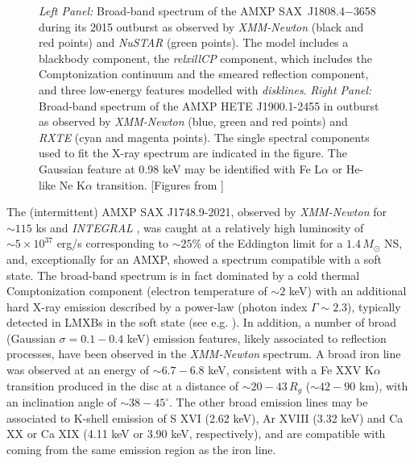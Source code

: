 \documentclass[graybox]{svmult}
\def \inte {{\em INTEGRAL\xspace}}
\def \xmm {{\em XMM-Newton\xspace}}
\def \rxte {{\em RXTE\xspace}}
\def \saxj{{\rm SAX~J1808.4$-$3658\xspace}}
\def \nustar{{\em NuSTAR\xspace}}
\begin{document}
\begin{figure}
\begin{subfigure}{.5\textwidth}
  \label{fig:sfig2}
\end{subfigure}
\caption{\textit{Left Panel:} Broad-band spectrum of the AMXP \saxj{} during its 2015 outburst as observed by \xmm{} (black and red points) and \nustar{} (green points). The model includes a blackbody component, the {\it relxillCP} component, which includes the Comptonization continuum and the smeared reflection component, and three low-energy features modelled with {\it disklines}. \textit{Right Panel:} Broad-band spectrum of the AMXP HETE J1900.1-2455 in outburst as observed by \xmm{} (blue, green and red points) and \rxte{} (cyan and magenta points). The single spectral components used to fit the X-ray spectrum are indicated in the figure. The Gaussian feature at 0.98 keV may be identified with Fe L$\alpha$ or He-like Ne K$\alpha$ transition. [Figures from \cite{DiSalvo2019,Papitto2013a}]}
\label{fig:spec}
\end{figure}





The (intermittent) AMXP SAX J1748.9-2021, observed by \xmm{} for $\sim 115$ ks and \inte{} \cite{Pintore2016}, was caught at a relatively high luminosity of $\sim 5 \times 10^{37}$ erg/s corresponding to $\sim 25\%$ of the Eddington limit for a $1.4\, M_\odot$ NS, and, exceptionally for an AMXP, showed a spectrum compatible with a soft state. The broad-band spectrum is in fact dominated by a cold thermal Comptonization component (electron temperature of $\sim 2$ keV) with an additional hard X-ray emission described by a power-law (photon index $\Gamma \sim 2.3$), typically detected in LMXBs in the soft state (see e.g. \cite{DiSalvo2000}). In addition, a number of broad (Gaussian $\sigma = 0.1 - 0.4$ keV) emission features, likely associated to reflection processes, have been observed in the \xmm{} spectrum. A broad iron line was observed at an energy of $\sim 6.7-6.8$ keV, consistent with a Fe XXV K$\alpha$ transition produced in the disc at a distance of $\sim 20-43\, R_g$ ($\sim 42 - 90$ km), with an inclination angle of $\sim 38-45^\circ$. The other broad emission lines may be associated to K-shell emission of S XVI (2.62 keV), Ar XVIII (3.32 keV) and Ca XX or Ca XIX (4.11 keV or 3.90 keV, respectively), and are compatible with coming from the same emission region as the iron line. 
\end{document}

